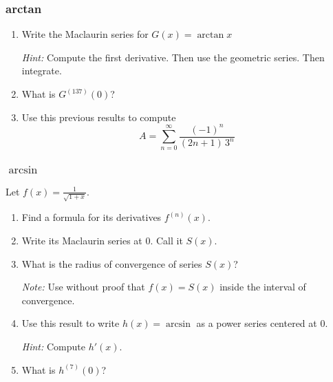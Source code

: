 \documentclass[14pt]{beamer}
\newcommand{\p}{\pause}
\newcommand{\setsize}[1]{\fontsize{#1}{#1}\selectfont} %
\newcommand{\vvv}{\vspace{.2cm}}
\begin{document}
	\begin{frame}[t]
		\frametitle{arctan}

		\begin{enumerate}
			\item Write the Maclaurin series for \; ${\displaystyle G(x) = \arctan x}$
				\vvv

				\emph{Hint:} Compute the first derivative. Then use the geometric series.
				Then integrate. \vvv

				\p

			\item What is ${\displaystyle G^{(137)}(0)}$? \vvv

				\p

			\item Use this previous results to compute
				\[
					A = \sum_{n=0}^{\infty}\frac{(-1)^{n}}{(2n+1) \, 3^{n} }
				\]
		\end{enumerate}
	\end{frame}
	\begin{frame}[t]
		\frametitle{$\arcsin$}

		Let ${\displaystyle f(x)=\frac{1}{\sqrt{1+x}}}$.
		\begin{enumerate}
			\item Find a formula for its derivatives ${\displaystyle f^{(n)}(x)}$.
				\vvv

			\item Write its Maclaurin series at $0$. Call it $S(x)$. \vvv

			\item What is the radius of convergence of series $S(x)$?

				{\setsize{12} \emph{Note:} Use without proof that ${\displaystyle f(x)=S(x)}$ inside the interval of convergence. }
				\vvv

			\item Use this result to write $h(x) = \arcsin$ as a power series centered
				at $0$.

				{\setsize{12} \emph{Hint:} Compute ${\displaystyle h'(x)}$. } \vvv

			\item What is ${\displaystyle h^{(7)}(0)}$?
		\end{enumerate}
	\end{frame}
\end{document}
